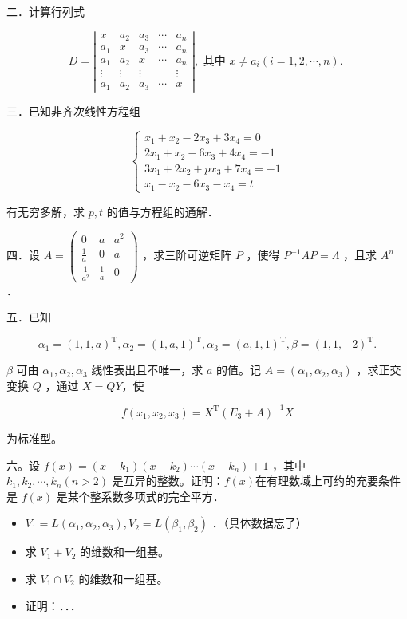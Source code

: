 \documentclass{article}
\begin{document}
二．计算行列式

\[
D=\left|\begin{array}{ccccc}
x & a_{2} & a_{3} & \cdots & a_{n} \\
a_{1} & x & a_{3} & \cdots & a_{n} \\
a_{1} & a_{2} & x & \cdots & a_{n} \\
\vdots & \vdots & \vdots & & \vdots \\
a_{1} & a_{2} & a_{3} & \cdots & x
\end{array}\right|, \text { 其中 } x \neq a_{i}(i=1,2, \cdots, n) \text {. }
\]

三．已知非齐次线性方程组

\[
\left\{\begin{array}{l}
x_{1}+x_{2}-2 x_{3}+3 x_{4}=0 \\
2 x_{1}+x_{2}-6 x_{3}+4 x_{4}=-1 \\
3 x_{1}+2 x_{2}+p x_{3}+7 x_{4}=-1 \\
x_{1}-x_{2}-6 x_{3}-x_{4}=t
\end{array}\right.
\]

有无穷多解，求 \(p, t\) 的值与方程组的通解．

四．设 \(A=\left(\begin{array}{ccc}0 & a & a^{2} \\ \frac{1}{a} & 0 & a \\ \frac{1}{a^{2}} & \frac{1}{a} & 0\end{array}\right)\) ，求三阶可逆矩阵 \(P\) ，使得 \(P^{-1} A P=\Lambda\) ，且求 \(A^{n}\) ．

五．已知

\[
\alpha_{1}=(1,1, a)^{\mathrm{T}}, \alpha_{2}=(1, a, 1)^{\mathrm{T}}, \alpha_{3}=(a, 1,1)^{\mathrm{T}}, \beta=(1,1,-2)^{\mathrm{T}} .
\]

\(\beta\) 可由 \(\alpha_{1}, \alpha_{2}, \alpha_{3}\) 线性表出且不唯一，求 \(a\) 的值。记 \(A=\left(\alpha_{1}, \alpha_{2}, \alpha_{3}\right)\) ，求正交变换 \(Q\) ，通过 \(X=Q Y\)，使

\[
f\left(x_{1}, x_{2}, x_{3}\right)=X^{\mathrm{T}}\left(E_{3}+A\right)^{-1} X
\]

为标准型。

六。设 \(f(x)=\left(x-k_{1}\right)\left(x-k_{2}\right) \cdots\left(x-k_{n}\right)+1\) ，其中 \(k_{1}, k_{2}, \cdots, k_{n}(n>2)\) 是互异的整数。证明：\(f(x)\)在有理数域上可约的充要条件是 \(f(x)\) 是某个整系数多项式的完全平方．

\begin{itemize}
  \item[七．] \(V_{1}=L\left(\alpha_{1}, \alpha_{2}, \alpha_{3}\right), V_{2}=L\left(\beta_{1}, \beta_{2}\right)\) ．（具体数据忘了）
  \item[（1）] 求 \(V_{1}+V_{2}\) 的维数和一组基。
  \item[（2）] 求 \(V_{1} \cap V_{2}\) 的维数和一组基。
  \item[（3）] 证明：．．．
\end{itemize}
\end{document}
